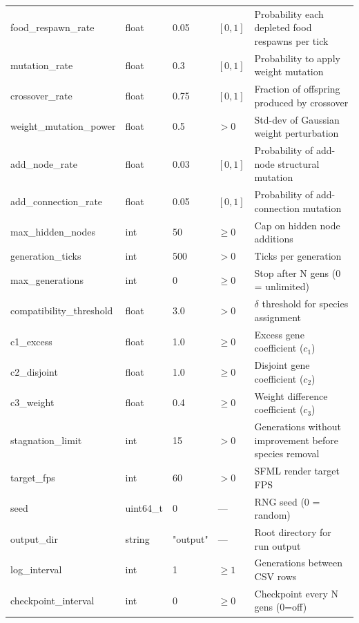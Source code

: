 \begin{longtable}[l]{@{}>{\ttfamily\small}p{3.2cm}>{\ttfamily\small}p{1.8cm}p{1.2cm}p{2cm}p{4.8cm}@{}}
food\_respawn\_rate    & float  & 0.05   & $[0,1]$       & Probability each depleted food respawns per tick \\
mutation\_rate         & float  & 0.3    & $[0,1]$       & Probability to apply weight mutation \\
crossover\_rate        & float  & 0.75   & $[0,1]$       & Fraction of offspring produced by crossover \\
weight\_mutation\_power& float  & 0.5    & $>0$          & Std-dev of Gaussian weight perturbation \\
add\_node\_rate        & float  & 0.03   & $[0,1]$       & Probability of add-node structural mutation \\
add\_connection\_rate  & float  & 0.05   & $[0,1]$       & Probability of add-connection mutation \\
max\_hidden\_nodes     & int    & 50     & $\ge 0$       & Cap on hidden node additions \\
generation\_ticks      & int    & 500    & $>0$          & Ticks per generation \\
max\_generations       & int    & 0      & $\ge 0$       & Stop after N gens (0 = unlimited) \\
compatibility\_threshold& float & 3.0   & $>0$          & $\delta$ threshold for species assignment \\
c1\_excess             & float  & 1.0    & $\ge 0$       & Excess gene coefficient ($c_1$) \\
c2\_disjoint           & float  & 1.0    & $\ge 0$       & Disjoint gene coefficient ($c_2$) \\
c3\_weight             & float  & 0.4    & $\ge 0$       & Weight difference coefficient ($c_3$) \\
stagnation\_limit      & int    & 15     & $>0$          & Generations without improvement before species removal \\
target\_fps            & int    & 60     & $>0$          & SFML render target FPS \\
seed                   & uint64\_t & 0   & —             & RNG seed (0 = random) \\
output\_dir            & string & "output" & — & Root directory for run output \\
log\_interval          & int    & 1      & $\ge 1$       & Generations between CSV rows \\
checkpoint\_interval   & int    & 0      & $\ge 0$       & Checkpoint every N gens (0=off) \\

\end{longtable}
